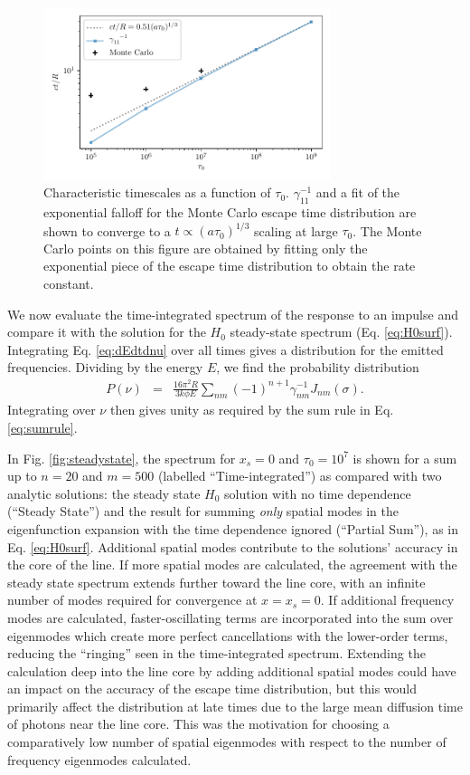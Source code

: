 \documentclass{aastex63}
\newcommand{\be}{\begin{eqnarray}}
\newcommand{\ee}{\end{eqnarray}}
\begin{document}
\begin{figure}
    \centering
    \includegraphics[width=0.75\textwidth]{tau_scaling.pdf}
    \caption{Characteristic timescales as a function of $\tau_0$. $\gamma_{11}^{-1}$ and a fit of the exponential falloff for the Monte Carlo escape time distribution are shown to converge to a $t \propto (a\tau_0)^{1/3}$ scaling at large $\tau_0$. The Monte Carlo points on this figure are obtained by fitting only the exponential piece of the escape time distribution to obtain the rate constant.}
    \label{fig:tau_scaling}
\end{figure}

We now evaluate the time-integrated spectrum of the response to an impulse and compare it with the solution for the $H_0$ steady-state spectrum (Eq. \ref{eq:H0surf}). Integrating Eq. \ref{eq:dEdtdnu} over all times gives a distribution for the emitted frequencies. Dividing by the energy $E$, we find the probability distribution
\be \label{eq:spectrum}
P(\nu) & = &  \frac{16\pi^2 R}{3k\phi E}  \sum_{nm} (-1)^{n+1} \gamma_{nm}^{-1} J_{nm}(\sigma).
\ee
Integrating over $\nu$ then gives unity as required by the sum rule in Eq. \ref{eq:sumrule}. 

In Fig. \ref{fig:steadystate}, the spectrum for $x_s=0$ and $\tau_0=10^7$ is shown for a sum up to $n=20$ and $m=500$ (labelled ``Time-integrated'') as compared with two analytic solutions: the steady state $H_0$ solution with no time dependence (``Steady State'') and the result for summing \textit{only} spatial modes in the eigenfunction expansion with the time dependence ignored (``Partial Sum''), as in Eq. \ref{eq:H0surf}. Additional spatial modes contribute to the solutions' accuracy in the core of the line. If more spatial modes are calculated, the agreement with the steady state spectrum extends further toward the line core, with an infinite number of modes required for convergence at $x=x_s=0$. If additional frequency modes are calculated, faster-oscillating terms are incorporated into the sum over eigenmodes which create more perfect cancellations with the lower-order terms, reducing the ``ringing'' seen in the time-integrated spectrum. Extending the calculation deep into the line core by adding additional spatial modes could have an impact on the accuracy of the escape time distribution, but this would primarily affect the distribution at late times due to the large mean diffusion time of photons near the line core. This was the motivation for choosing a comparatively low number of spatial eigenmodes with respect to the number of frequency eigenmodes calculated.
\end{document}
